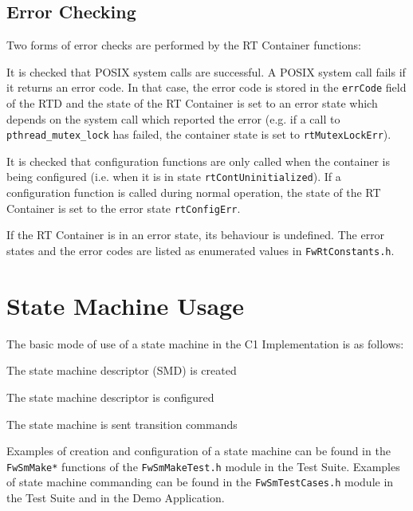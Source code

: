 \documentclass[a4paper,10pt]{article}
\let\stdsection\section
\renewcommand\section{\newpage\stdsection}
\newenvironment{fw_itemize}						%
{\begin{itemize}
  \setlength{\itemsep}{1mm}
  \setlength{\parskip}{0pt}
  \setlength{\parsep}{0pt}}
{\end{itemize}}
\newenvironment{fw_enumerate}					%
{\begin{enumerate}
  \setlength{\itemsep}{1mm}
  \setlength{\parskip}{0pt}
  \setlength{\parsep}{0pt}}
{\end{enumerate}}
\begin{document}
\subsection{Error Checking}\label{sec:rtErrChecking}
Two forms of error checks are performed by the RT Container functions:
\begin{fw_enumerate}
\item It is checked that POSIX system calls are successful. A POSIX system call fails if it returns an error code. In that case, the error code is stored in the \texttt{errCode} field of the RTD and the state of the RT Container is set to an error state which depends on the system call which reported the error (e.g. if a call to \texttt{pthread\_mutex\_lock} has failed, the container state is set to \texttt{rtMutexLockErr}).
\item It is checked that configuration functions are only called when the container is being configured (i.e. when it is in state \texttt{rtContUninitialized}). If a configuration function is called during normal operation, the state of the RT Container is set to the error state \texttt{rtConfigErr}.
\end{fw_enumerate} 

If the RT Container is in an error state, its behaviour is undefined. The error states and the error codes are listed as enumerated values in \texttt{FwRtConstants.h}.

\section{State Machine Usage}\label{sec:smUsage} 

The basic mode of use of a state machine in the C1 Implementation is as follows:

\begin{fw_itemize}
\item The state machine descriptor (SMD) is created
\item The state machine descriptor is configured
\item The state machine is sent transition commands
\end{fw_itemize}

Examples of creation and configuration of a state machine can be found in the \texttt{FwSmMake*} functions of 
the \texttt{FwSmMakeTest.h} module in the Test Suite. Examples of state machine commanding can be found in the 
\texttt{FwSmTestCases.h} module in the Test Suite and in the Demo Application.
\end{document}
